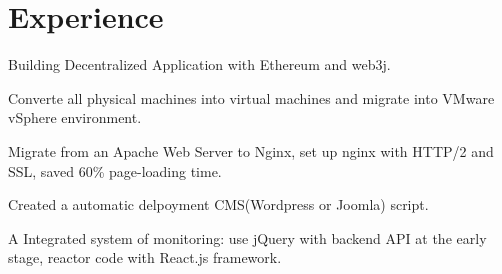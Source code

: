 \documentclass[]{deedy-resume-openfont}
\begin{document}
%
%
\lastupdated

%
%

%
%

\begin{minipage}[t]{0.45\textwidth}



\section{Experience}

\vspace{\topsep} %
\begin{tightemize}
    \item Building Decentralized Application with Ethereum and web3j.
\end{tightemize}
\sectionsep

\vspace{\topsep} %
\begin{tightemize}
    \item Converte all physical machines into virtual machines and migrate into VMware vSphere environment.
    \item Migrate from an Apache Web Server to Nginx, set up nginx with HTTP/2 and SSL, saved 60\% page-loading time.
    \item Created a automatic delpoyment CMS(Wordpress or Joomla) script.
\end{tightemize}
\sectionsep

\begin{tightemize}
    \item A Integrated system of monitoring: use jQuery with backend API at the early stage, reactor code with React.js framework.
\end{tightemize}
\sectionsep



\end{minipage}
\end{document}
